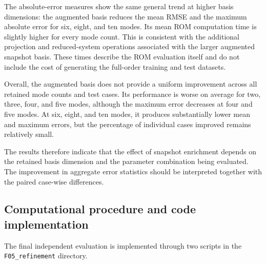 The absolute-error measures show the same general trend
at higher basis dimensions: the augmented basis reduces
the mean RMSE and the maximum absolute error for six,
eight, and ten modes. Its mean ROM computation time is
slightly higher for every mode count. This is consistent
with the additional projection and reduced-system
operations associated with the larger augmented
snapshot basis. These times describe the ROM evaluation
itself and do not include the cost of generating the
full-order training and test datasets.

Overall, the augmented basis does not provide a uniform
improvement across all retained mode counts and test
cases. Its performance is worse on average for two,
three, four, and five modes, although the maximum
error decreases at four and five modes. At six, eight,
and ten modes, it produces substantially lower mean
and maximum errors, but the percentage of individual
cases improved remains relatively small.

The results therefore indicate that the effect of
snapshot enrichment depends on the retained basis
dimension and the parameter combination being
evaluated. The improvement in aggregate error
statistics should be interpreted together with the
paired case-wise differences.

\subsection{Computational procedure and code implementation}

The final independent evaluation is implemented through
two scripts in the \texttt{F05\_refinement} directory.

